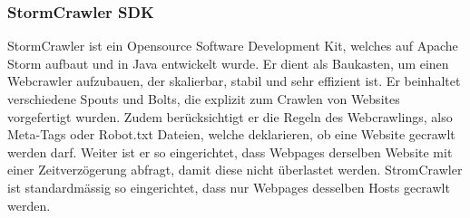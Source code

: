 \subsubsection{StormCrawler SDK}
StormCrawler ist ein Opensource Software Development Kit, welches auf Apache Storm aufbaut und in Java entwickelt wurde.
Er dient als Baukasten, um einen Webcrawler aufzubauen, der skalierbar, stabil und sehr effizient ist.
Er beinhaltet verschiedene Spouts und Bolts, die explizit zum Crawlen von Websites vorgefertigt wurden.
Zudem berücksichtigt er die Regeln des Webcrawlings, also Meta-Tags oder Robot.txt Dateien, welche deklarieren, ob eine Website gecrawlt werden darf.
Weiter ist er so eingerichtet, dass Webpages derselben Website mit einer Zeitverzögerung abfragt, damit diese nicht überlastet werden.
StromCrawler ist standardmässig so eingerichtet, dass nur Webpages desselben Hosts gecrawlt werden.
